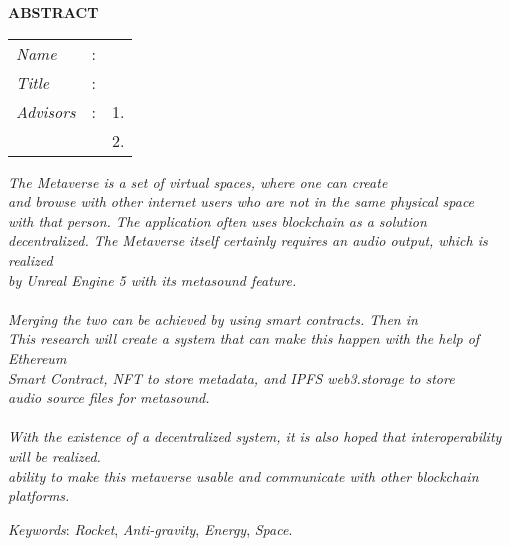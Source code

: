 \begin{center}
  \large\textbf{ABSTRACT}
\end{center}


\vspace{2ex}

\begingroup
\setlength{\tabcolsep}{0pt}

\noindent
\begin{tabularx}{\textwidth}{l >{\centering}m{3em} X}
  \emph{Name}     & : & \name{}         \\

  \emph{Title}    & : & \engtatitle{}   \\

  \emph{Advisors} & : & 1. \advisor{}   \\
                  &   & 2. \coadvisor{} \\
\end{tabularx}
\endgroup

\emph{The Metaverse is a set of virtual spaces, where one can create\\
  and browse with other internet users who are not in the same physical space\\
  with that person. The application often uses blockchain as a solution\\
  decentralized. The Metaverse itself certainly requires an audio output, which is realized\\
  by Unreal Engine 5 with its metasound feature.\\
  \\
  Merging the two can be achieved by using smart contracts. Then in\\
  This research will create a system that can make this happen with the help of Ethereum\\
  Smart Contract, NFT to store metadata, and IPFS web3.storage to store\\
  audio source files for metasound.\\
  \\
  With the existence of a decentralized system, it is also hoped that interoperability will be realized.\\
  ability to make this metaverse usable and communicate with other blockchain platforms.}

\emph{Keywords}: \emph{Rocket}, \emph{Anti-gravity}, \emph{Energy}, \emph{Space}.
